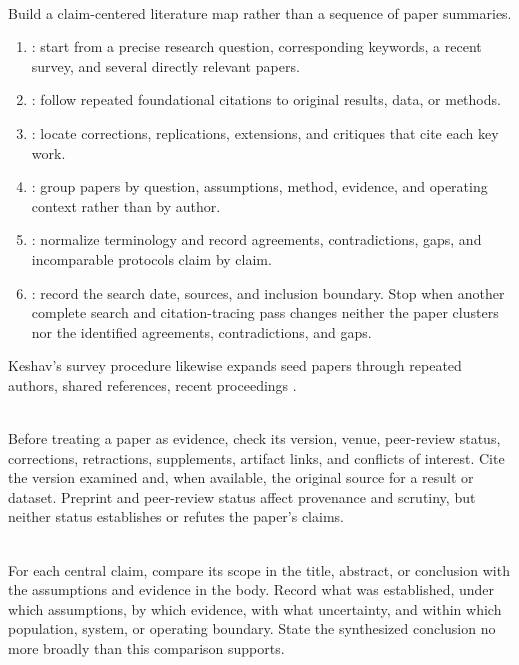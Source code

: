 \begin{process} \label{proc:literature-synthesis} \\
Build a claim-centered literature map rather than a sequence of paper summaries.
\begin{enumerate}[label=(\roman*)]
\setlength{\itemsep}{0pt}
\item {}: start from a precise research question, corresponding keywords, a recent survey, and several directly relevant papers.
\item {}: follow repeated foundational citations to original results, data, or methods.
\item {}: locate corrections, replications, extensions, and critiques that cite each key work.
\item {}: group papers by question, assumptions, method, evidence, and operating context rather than by author.
\item {}: normalize terminology and record agreements, contradictions, gaps, and incomparable protocols claim by claim.
\item {}: record the search date, sources, and inclusion boundary. Stop when another complete search and citation-tracing pass changes neither the paper clusters nor the identified agreements, contradictions, and gaps.
\end{enumerate}
Keshav's survey procedure likewise expands seed papers through repeated authors, shared references, recent proceedings \citep{keshav2007readpaper}.
\end{process}

\begin{warning} \label{warn:paper-version-and-source-status} \\
Before treating a paper as evidence, check its version, venue, peer-review status, corrections, retractions, supplements, artifact links, and conflicts of interest. Cite the version examined and, when available, the original source for a result or dataset. Preprint and peer-review status affect provenance and scrutiny, but neither status establishes or refutes the paper's claims.
\end{warning}

\begin{principle} \label{princ:read-against-the-claim} \\
For each central claim, compare its scope in the title, abstract, or conclusion with the assumptions and evidence in the body. Record what was established, under which assumptions, by which evidence, with what uncertainty, and within which population, system, or operating boundary. State the synthesized conclusion no more broadly than this comparison supports.
\end{principle}
